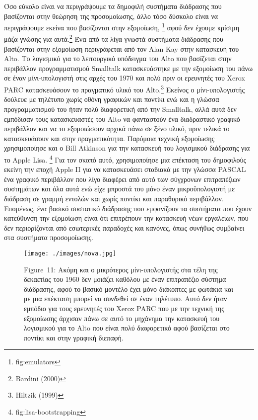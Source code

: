 \documentclass[
]{article}
\begin{document}
Όσο εύκολο είναι να περιγράψουμε τα δημοφιλή συστήματα διάδρασης που
βασίζονται στην θεώρηση της προσομοίωσης, άλλο τόσο δύσκολο είναι να
περιγράψουμε εκείνα που βασίζονται στην εξομοίωση, \footnote{fig:emulators}
αφού δεν έχουμε κρίσιμη μάζα γνώσης για αυτά.\footnote{Bardini (2000)}
Ένα από τα λίγα γνωστά συστήματα διάδρασης που βασίζονται στην εξομοίωση
περιγράφεται από τον Alan Kay στην κατασκευή του Alto. Το λογισμικό για
το λειτουργικό υπόδειγμα του Alto που βασίζεται στην περιβάλλον
προγραμματισμού Smalltalk κατασκευάστηκε με την εξομοίωση του πάνω σε
έναν μίνι-υπολογιστή στις αρχές του 1970 και πολύ πριν οι ερευνητές του
Xerox PARC κατασκευάσουν το πραγματικό υλικό του Alto.\footnote{Hiltzik
  (1999)} Εκείνος ο μίνι-υπολογιστής δούλευε με τηλέτυπο χωρίς οθόνη
γραφικών και ποντίκι ενώ και η γλώσσα προγραμματισμού του ήταν πολύ
διαφορετική από την Smalltalk, αλλά αυτά δεν εμπόδισαν τους
κατασκευαστές του Alto να φανταστούν ένα διαδραστικό γραφικό περιβάλλον
και να το εξομοιώσουν αρχικά πάνω σε ξένο υλικό, πριν τελικά το
κατασκευάσουν και στην πραγματικότητα. Παρόμοια τεχνική εξομοίωσης
χρησιμοποίησε και ο Bill Atkinson για την κατασκευή του λογισμικού
διάδρασης για το Apple Lisa. \footnote{fig:lisa-bootstrapping} Για τον
σκοπό αυτό, χρησιμοποίησε μια επέκταση του δημοφιλούς εκείνη την εποχή
Apple II για να κατασκευάσει σταδιακά με την γλώσσα PASCAL ένα γραφικό
περιβάλλον που λίγο διαφέρει από αυτό των σύγχρονων επιτραπέζιων
συστημάτων και όλα αυτά ενώ είχε μπροστά του μόνο έναν μικροϋπολογιστή
με διάδραση σε γραμμή εντολών και χωρίς ποντίκι και παραθυρικό
περιβάλλον. Επομένως, ένα βασικό συστατικό διάδρασης που εμφανίζουν τα
συστήματα που έχουν κατεύθυνση την εξομοίωση είναι ότι επιτρέπουν την
κατασκευή νέων εργαλείων, που δεν περιορίζονται από εσωτερικές παραδοχές
και κανόνες, όπως συνήθως συμβαίνει στα συστήματα προσομοίωσης.

\leavevmode{}%
\begin{figure}
\hypertarget{fig:nova}{%
\centering
\texttt{[image: ./images/nova.jpg]}
\caption{Figure~11: Ακόμη και ο μικρότερος μίνι-υπολογιστής στα τέλη της
δεκαετίας του 1960 δεν μοιάζει καθόλου με έναν επιτραπέζιο σύστημα
διάδρασης, αφού το βασικό μοντέλο έχει μόνο διάκοπτες με φωτάκια και με
μια επέκταση μπορεί να συνδεθεί σε έναν τηλέτυπο. Αυτό δεν ήταν εμπόδιο
για τους ερευνητές του Xerox PARC που με την τεχνική της εξομοίωσης
άρχισαν πάνω σε αυτό το μηχάνημα την κατασκευή του λογισμικού για το
Alto που είναι πολύ διαφορετικό αφού βασίζεται στο ποντίκι και στην
γραφική διεπαφή.}\label{fig:nova}
}
\end{figure}
\end{document}
